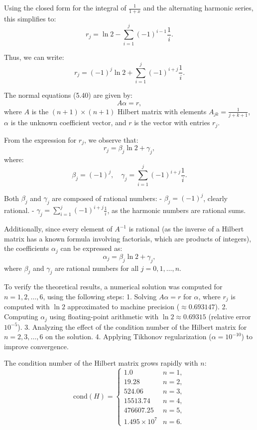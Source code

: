 \documentclass[a4paper]{article}
\begin{document}
Using the closed form for the integral of \( \frac{1}{1+x} \) and the alternating harmonic series, this simplifies to:
\[
r_j = \ln 2 - \sum_{i=1}^j (-1)^{i-1} \frac{1}{i}.
\]

Thus, we can write:
\[
r_j = (-1)^j \ln 2 + \sum_{i=1}^j (-1)^{i+j} \frac{1}{i}.
\]

The normal equations (5.40) are given by:
\[
A \alpha = r,
\]
where \( A \) is the \((n+1) \times (n+1)\) Hilbert matrix with elements \( A_{jk} = \frac{1}{j+k+1} \), \( \alpha \) is the unknown coefficient vector, and \( r \) is the vector with entries \( r_j \).

From the expression for \( r_j \), we observe that:
\[
r_j = \beta_j \ln 2 + \gamma_j,
\]
where:
\[
\beta_j = (-1)^j, \quad \gamma_j = \sum_{i=1}^j (-1)^{i+j} \frac{1}{i}.
\]

Both \( \beta_j \) and \( \gamma_j \) are composed of rational numbers:
- \( \beta_j = (-1)^j \), clearly rational.
- \( \gamma_j = \sum_{i=1}^j (-1)^{i+j} \frac{1}{i} \), as the harmonic numbers are rational sums.

Additionally, since every element of \( A^{-1} \) is rational (as the inverse of a Hilbert matrix has a known formula involving factorials, which are products of integers), the coefficients \( \alpha_j \) can be expressed as:
\[
\alpha_j = \beta_j \ln 2 + \gamma_j,
\]
where \( \beta_j \) and \( \gamma_j \) are rational numbers for all \( j = 0, 1, \ldots, n \).

To verify the theoretical results, a numerical solution was computed for \( n = 1, 2, \ldots, 6 \), using the following steps:
1. Solving \( A \alpha = r \) for \( \alpha \), where \( r_j \) is computed with \( \ln 2 \) approximated to machine precision (\( \approx 0.693147 \)).
2. Computing \( \alpha_j \) using floating-point arithmetic with \( \ln 2 \approx 0.69315 \) (relative error \( 10^{-5} \)).
3. Analyzing the effect of the condition number of the Hilbert matrix for \( n = 2, 3, \ldots, 6 \) on the solution.
4. Applying Tikhonov regularization (\( \alpha = 10^{-10} \)) to improve convergence.

The condition number of the Hilbert matrix grows rapidly with \( n \):
\[
\text{cond}(H) = 
\begin{cases}
1.0 & n = 1, \\
19.28 & n = 2, \\
524.06 & n = 3, \\
15513.74 & n = 4, \\
476607.25 & n = 5, \\
1.495 \times 10^7 & n = 6.
\end{cases}
\]
\end{document}

